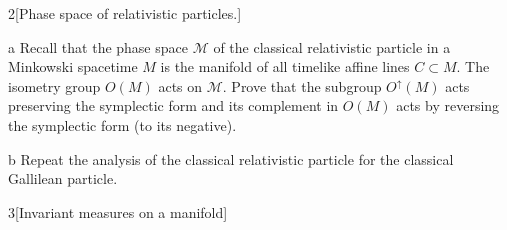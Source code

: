 \documentclass{pset}
\begin{document}
\begin{problem}{2}[Phase space of relativistic particles.]
\end{problem}

\begin{parts}
  \begin{part}{a}
    Recall that the phase space $\mathcal{M}$ of the classical relativistic particle in a Minkowski spacetime $M$ is the manifold of all timelike affine lines $C\subset M$. The isometry group $O(M)$ acts on $\mathcal{M}$. Prove that the subgroup $O^\uparrow(M)$ acts preserving the symplectic form and its complement in $O(M)$ acts by reversing the symplectic form (to its negative).
  \end{part}

  \begin{part}{b}
    Repeat the analysis of the classical relativistic particle for the classical Gallilean particle.
  \end{part}
\end{parts}

\begin{problem}{3}[Invariant measures on a manifold]
\end{problem}
\end{document}
